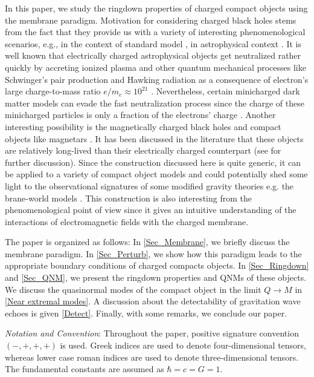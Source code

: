 \documentclass[aps,prd,twocolumn,floatfix,noshowpacs,tightenlines,noshowkeys,superscriptaddress,amsmath,amssymb,
nofootinbib]{revtex4-1}
\renewcommand\[{\begin{equation}}
\renewcommand\]{\end{equation}}
\begin{document}
 In this paper, we study the ringdown properties of charged compact objects using the membrane paradigm. Motivation for considering charged black holes stems from the fact that they provide us with a variety of interesting phenomenological scenarios, e.g., in the context of standard model \cite{Maldacena:2020skw}, in astrophysical context \cite{Mereghetti:2008je}. It is well known that electrically charged astrophysical objects get neutralized rather quickly by accreting ionized plasma and other quantum mechanical processes like Schwinger's pair production and Hawking radiation as a consequence of electron's large charge-to-mass ratio $e/m_e\approx10^{21}$ \cite{Cardoso:2016olt, Ghosh:2020tdu}. Nevertheless, certain minicharged dark matter models can evade the fast neutralization process since the charge of these minicharged particles is only a fraction of the electrons' charge \cite{Cardoso:2016olt}. Another interesting possibility is the magnetically charged black holes \cite{Maldacena:2020skw, Ghosh:2020tdu} and compact objects like magnetars \cite{Mereghetti:2008je}. It has been discussed in the literature that these objects are relatively long-lived than their electrically charged counterpart (see \cite{Ghosh:2020tdu} for further discussion). Since the construction discussed here is quite generic, it can be applied to a variety of compact object models \cite{Mathur:2005zp,Bena:2007kg,Bena:2013dka,Skenderis:2008qn,Mathur:2008nj,Chapline:2000en,Mazur:2004fk,Visser:2003ge,Brito:2015yga, Liebling:2012fv, Seidel:1993zk,Gimon:2007ur,Buoninfante:2019swn,Damour:2007ap,Roy:2019yrr} and could potentially shed some light to the observational signatures of some modified gravity theories e.g. the brane-world models \cite{Dadhich:2000am,Dey:2020lhq,Dey:2020pth,Chakraborty:2021gdf}. This construction is also interesting from the phenomenological point of view since it gives an intuitive understanding of the interactions of electromagnetic fields with the charged membrane.\par
The paper is organized as follows: In \autoref{Sec_Membrane}, we briefly discuss the membrane paradigm. In \autoref{Sec_Perturb}, we show how this paradigm leads to the appropriate boundary conditions of charged compacts objects. In \autoref{Sec_Ringdown} and \autoref{Sec_QNM}, we present the ringdown properties and QNMs of these objects. We discuss the quasinormal modes of the compact object in the limit $Q\to M$ in \autoref{Near extremal modes}. A discussion about the detectability of gravitation wave echoes is given \autoref{Detect}. Finally, with some remarks, we conclude our paper.\par
\textit{Notation and Convention}: Throughout the paper, positive signature convention $(-,+,+,+)$ is used. Greek indices are used to denote four-dimensional tensors, whereas lower case roman indices are used to denote three-dimensional tensors. The fundamental constants are assumed as $\hbar=c=G=1$.
\end{document}
